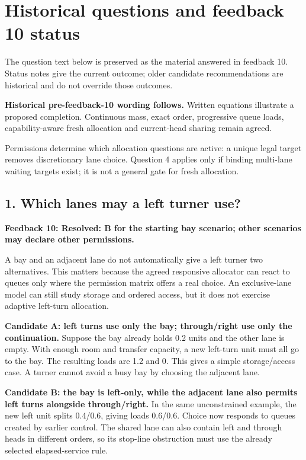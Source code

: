 \documentclass[11pt,a4paper]{article}
\begin{document}
\clearpage
\appendix
\section{Historical questions and feedback 10 status}

The question text below is preserved as the material answered in feedback 10.
Status notes give the current outcome; older candidate recommendations are
historical and do not override those outcomes.

\textbf{Historical pre-feedback-10 wording follows.} Written equations illustrate a proposed completion. Continuous mass, exact order, progressive queue loads, capability-aware fresh allocation and current-head sharing remain agreed.

Permissions determine which allocation questions are active: a unique legal target removes discretionary lane choice. Question 4 applies only if binding multi-lane waiting targets exist; it is not a general gate for fresh allocation.

\subsection*{1. Which lanes may a left turner use?}

\textbf{Feedback 10: Resolved: B for the starting bay scenario; other scenarios may declare other permissions.}

A bay and an adjacent lane do not automatically give a left turner two alternatives. This matters because the agreed responsive allocator can react to queues only where the permission matrix offers a real choice. An exclusive-lane model can still study storage and ordered access, but it does not exercise adaptive left-turn allocation.

\textbf{Candidate A: left turns use only the bay; through/right use only the continuation.} Suppose the bay already holds 0.2 units and the other lane is empty. With enough room and transfer capacity, a new left-turn unit must all go to the bay. The resulting loads are 1.2 and 0. This gives a simple storage/access case. A turner cannot avoid a busy bay by choosing the adjacent lane.

\textbf{Candidate B: the bay is left-only, while the adjacent lane also permits left turns alongside through/right.} In the same unconstrained example, the new left unit splits 0.4/0.6, giving loads 0.6/0.6. Choice now responds to queues created by earlier control. The shared lane can also contain left and through heads in different orders, so its stop-line obstruction must use the already selected elapsed-service rule.
\end{document}
